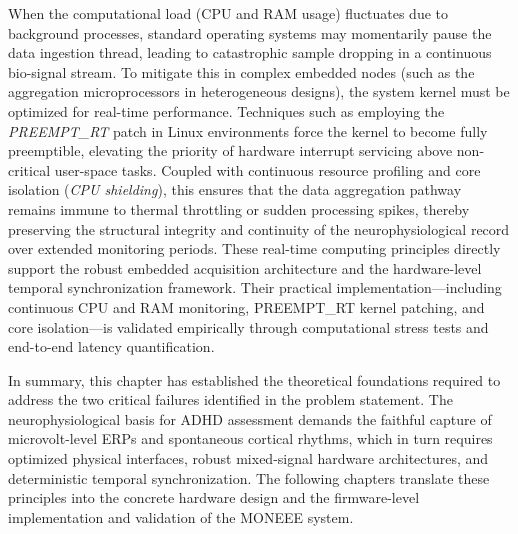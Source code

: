 When the computational load (CPU and RAM usage) fluctuates due to background processes, standard operating systems may momentarily pause the data ingestion thread, leading to catastrophic sample dropping in a continuous bio-signal stream. To mitigate this in complex embedded nodes (such as the aggregation microprocessors in heterogeneous designs), the system kernel must be optimized for real-time performance. Techniques such as employing the \textit{PREEMPT\_RT} patch in Linux environments force the kernel to become fully preemptible, elevating the priority of hardware interrupt servicing above non-critical user-space tasks. Coupled with continuous resource profiling and core isolation (\textit{CPU shielding}), this ensures that the data aggregation pathway remains immune to thermal throttling or sudden processing spikes, thereby preserving the structural integrity and continuity of the neurophysiological record over extended monitoring periods. These real-time computing principles directly support the robust embedded acquisition architecture and the hardware-level temporal synchronization framework. Their practical implementation---including continuous CPU and RAM monitoring, PREEMPT\_RT kernel patching, and core isolation---is validated empirically through computational stress tests and end-to-end latency quantification.

In summary, this chapter has established the theoretical foundations required to address the two critical failures identified in the problem statement. The neurophysiological basis for ADHD assessment demands the faithful capture of microvolt-level ERPs and spontaneous cortical rhythms, which in turn requires optimized physical interfaces, robust mixed-signal hardware architectures, and deterministic temporal synchronization. The following chapters translate these principles into the concrete hardware design and the firmware-level implementation and validation of the MONEEE system.
